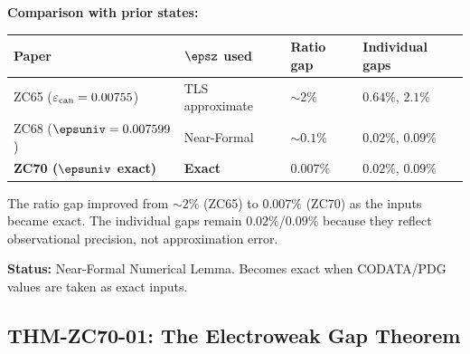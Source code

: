 \documentclass[12pt, a4paper]{article}
\renewcommand{\epscan}{\varepsilon_{\rm can}}
\begin{document}
\begin{derivedbox}[title={LEM-ZC70-02: Ratio Numerical Verification ---
  Gap $0.007\%$ ($R_0/R_{\max}$, Near-Formal)}]
\textbf{Comparison with prior states:}
\begin{center}
\renewcommand{\arraystretch}{1.25}
\begin{tabular}{@{}llll@{}}
\toprule
Paper & $\epsz$ used & Ratio gap & Individual gaps \\
\midrule
ZC65 ($\epscan = 0.00755$) & TLS approximate & $\sim 2\%$ & $0.64\%$, $2.1\%$ \\
ZC68 ($\epsuniv = 0.007599$) & Near-Formal & $\sim 0.1\%$ & $0.02\%$, $0.09\%$ \\
\textbf{ZC70 ($\epsuniv$ exact)} & \textbf{Exact} & $\mathbf{0.007\%}$ & $\mathbf{0.02\%}$, $\mathbf{0.09\%}$ \\
\bottomrule
\end{tabular}
\end{center}

The ratio gap improved from $\sim 2\%$ (ZC65) to
$0.007\%$ (ZC70) as the inputs became exact.
The individual gaps remain $0.02\%$/$0.09\%$
because they reflect observational precision,
not approximation error.

\textbf{Status:} Near-Formal Numerical Lemma.
Becomes exact when CODATA/PDG values are taken as exact inputs.
\end{derivedbox}

\subsection{THM-ZC70-01: The Electroweak Gap Theorem}
\label{sec:thm01}

\end{document}
